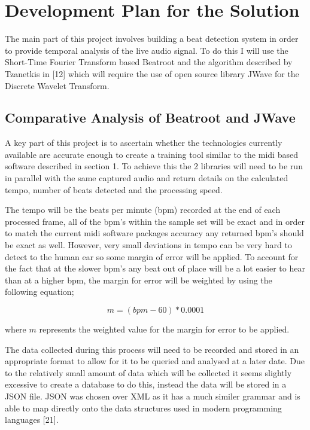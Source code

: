 \documentclass[a4paper, 11pt]{article}
\begin{document}
\section{Development Plan for the Solution}

The main part of this project involves building a beat detection system in order to provide temporal analysis of the live audio signal. To do this I will use the Short-Time Fourier Transform based Beatroot and the algorithm described by Tzanetkis in [12] which will require the use of open source library JWave for the Discrete Wavelet Transform. 



\subsection{Comparative Analysis of Beatroot and JWave}
A key part of this project is to ascertain whether the technologies currently available are accurate enough to create a training tool similar to the midi based software described in section 1. To achieve this the 2 libraries will need to be run in parallel with the same captured audio and return details on the calculated tempo, number of beats detected and the processing speed. 

The tempo will be the beats per minute (bpm) recorded at the end of each processed frame, all of the bpm's within the sample set will be exact and in order to match the current midi software packages accuracy any returned bpm's should be exact as well. However, very small deviations in tempo can be very hard to detect to the human ear so some margin of error will be applied. To account for the fact that at the slower bpm's any beat out of place will be a lot easier to hear than at a higher bpm, the margin for error will be weighted by using the following equation;

\[ m = (bpm - 60) * 0.0001\]
\begin{flushleft}
where \(m\) represents the weighted value for the margin for error to be applied.
\end{flushleft}
The data collected during this process will need to be recorded and stored in an appropriate format to allow for it to be queried and analysed at a later date. Due to the relatively small amount of data which will be collected it seems slightly excessive to create a database to do this, instead the data will be stored in a JSON file. JSON was chosen over XML as it has a much similer grammar and is able to map directly onto the data structures used in modern programming languages [21].
\end{document}
